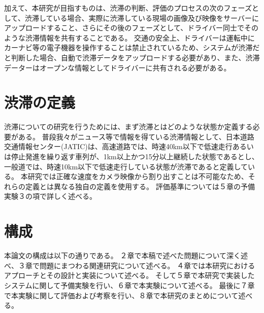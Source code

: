 加えて、本研究が目指すものは、渋滞の判断、評価のプロセスの次のフェーズとして、渋滞している場合、実際に渋滞している現場の画像及び映像をサーバーにアップロードすること、さらにその後のフェーズとして、ドライバー同士でそのような渋滞情報を共有することである。
交通の安全上、ドライバーは運転中にカーナビ等の電子機器を操作することは禁止されているため、システムが渋滞だと判断した場合、自動で渋滞データをアップロードする必要があり、また、渋滞データーはオープンな情報としてドライバーに共有される必要がある。

\newpage

\section{渋滞の定義}
渋滞についての研究を行うためには、まず渋滞とはどのような状態か定義する必要がある。
普段我々がニュース等で情報を得ている渋滞情報として、日本道路交通情報センター(JATIC)は、高速道路では、時速40km以下で低速走行あるいは停止発進を繰り返す車列が、1km以上かつ15分以上継続した状態であるとし、一般道では、時速10km以下で低速走行している状態が渋滞であると定義している。
本研究では正確な速度をカメラ映像から割り出すことは不可能なため、それらの定義とは異なる独自の定義を使用する。
評価基準については５章の予備実験３の項で詳しく述べる。

\section{構成}
本論文の構成は以下の通りである。
２章で本稿で述べた問題について深く述べ、３章で問題にまつわる関連研究について述べる。
４章では本研究におけるアプローチとその設計と実装について述べる。
そして５章で本研究で実装したシステムに関して予備実験を行い、６章で本実験について述べる。
最後に７章で本実験に関して評価および考察を行い、８章で本研究のまとめについて述べる。